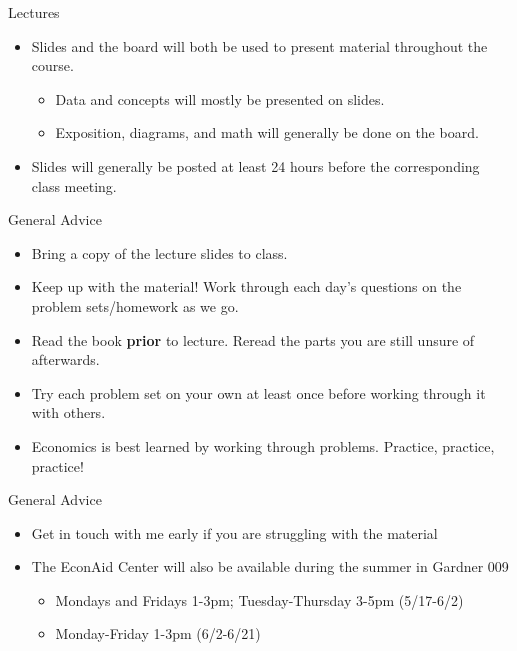 \documentclass[xcolor={dvipsnames},pdf, hyperref={colorlinks=true, citecolor=ForestGreen, linkcolor=BlueViolet, urlcolor=Magenta}]{beamer}
\begin{document}
\begin{frame}{Lectures}
\begin{itemize}
	\item Slides and the board will both be used to present material throughout the course.
		\begin{itemize}
			\item Data and concepts will mostly be presented on slides.
			\item Exposition, diagrams, and math will generally be done on the board.
		\end{itemize}
	\item Slides will generally be posted at least 24 hours before the corresponding class meeting.
\end{itemize}
\end{frame}

\begin{frame}{General Advice}
	
\begin{itemize}
	\item Bring a copy of the lecture slides to class.
	\item Keep up with the material! Work through each day's questions on the problem sets/homework as we go.
	\item Read the book \textbf{prior} to lecture. Reread the parts you are still unsure of afterwards.
	\item Try each problem set on your own at least once before working through it with others.
	\item Economics is best learned by working through problems. Practice, practice, practice!
\end{itemize}
		
\end{frame}


\begin{frame}{General Advice}
	
	\begin{itemize}
	\item Get in touch with me early if you are struggling with the material 
	\item The EconAid Center will also be available during the summer in Gardner 009
	\begin{itemize}
		\item Mondays and Fridays 1-3pm; Tuesday-Thursday 3-5pm (5/17-6/2)
		\item Monday-Friday 1-3pm (6/2-6/21)
	\end{itemize}
	\end{itemize}
	
\end{frame}
\end{document}

